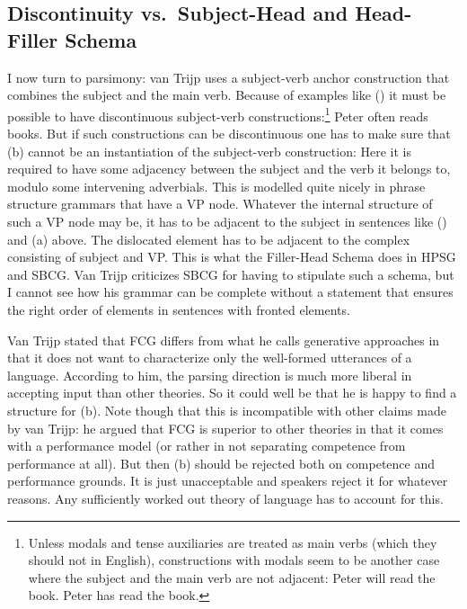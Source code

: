 \subsection{Discontinuity vs.\ Subject-Head and Head-Filler Schema}
\label{sec-discontinuous-constituents-fcg}

I now turn to parsimony: van Trijp uses a subject-verb anchor construction that combines the subject
and the main verb. Because of examples like () it must be possible to have discontinuous subject-verb constructions:\footnote{%
  Unless modals and tense auxiliaries are treated as main verbs (which they should not in English), constructions with
  modals seem to be another case where the subject and the main verb are not adjacent:
  \eal
  \ex Peter will read the book.
  \ex Peter has read the book.
  \zllast
} 
\ea
Peter often reads books.
\z
\largerpage
But if such constructions can be discontinuous one has to make sure that (b) cannot be an
instantiation of the subject-verb construction:
\eal
{}
\zl
Here it is required to have some adjacency between the subject and the verb it belongs to, modulo
some intervening adverbials. This is modelled quite nicely in phrase structure grammars that have a
VP node. Whatever the internal structure of such a VP node may be, it has to be adjacent to the
subject in sentences like  () and (a) above. The dislocated element has to be adjacent to the complex
consisting of subject and VP. This is what the Filler-Head Schema does in HPSG and SBCG. Van Trijp
criticizes SBCG for having to stipulate such a schema, but I cannot see how his grammar can be
complete without a statement that ensures the right order of elements in sentences with fronted
elements.

Van Trijp stated that FCG differs from what he calls generative approaches in that it does not want
to characterize only the well-formed utterances of a language. According to him, the parsing direction
 is much more liberal in accepting input than other theories. So it could well be that he
is happy to find a structure for (b). Note though that this is incompatible with other claims
made by van Trijp: he argued that FCG is superior to other theories in that it comes with a performance
model (or rather in not separating competence from performance at all). But then (b) should be
rejected both on competence and performance grounds. It is just unacceptable and speakers reject it
for whatever reasons. Any sufficiently worked out theory of language has to account for this.


